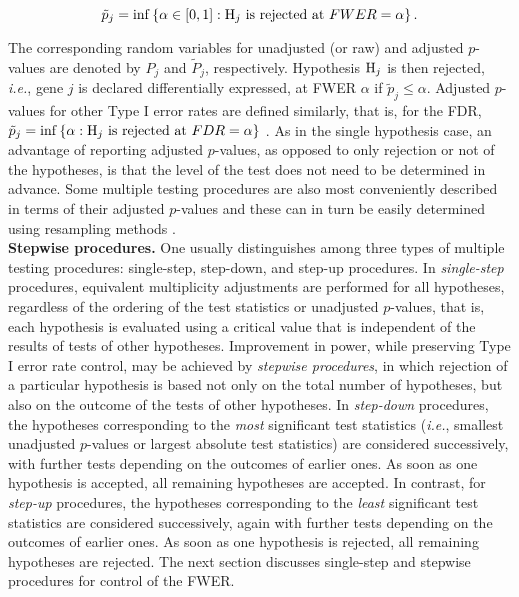 \documentclass[11pt]{article}
\begin{document}
$$\tilde{p}_j = \inf\left \{\alpha \in [0,1]: \mbox{${\rm H}_j$ is rejected at $FWER = \alpha$} \right \}.$$

The corresponding random variables for unadjusted (or raw) and adjusted
$p$-values are denoted by $P_j$ and $\tilde{P}_j$, respectively. Hypothesis ${\rm H}_j$ is then rejected, {\it i.e.}, gene $j$ is
declared differentially expressed, at FWER $\alpha$ if $\tilde{p}_j
\leq \alpha$. Adjusted $p$-values for other Type I error rates are
defined similarly, that is, for the FDR,  $\tilde{p}_j = \inf\left
  \{\alpha : \mbox{${\rm H}_j$ is rejected at $FDR = \alpha$} \right
\}$ \citep{Yekutieli&Benjamini99}. As in the single hypothesis case, an
advantage of reporting adjusted $p$-values, as opposed to only
rejection or not of the hypotheses, is that the level of the test does
not need to be determined in advance. Some multiple testing procedures
are also most conveniently described in terms of their adjusted
$p$-values and these can in turn be easily determined using resampling
methods \citep{Westfall&Young93}.\\

{\bf Stepwise procedures.} One usually distinguishes among three
types of multiple testing procedures: single-step, step-down, and
step-up procedures. In {\it single-step} procedures, equivalent
multiplicity adjustments are performed for all hypotheses, regardless
of the ordering of the test statistics or unadjusted
$p$-values, that is, each hypothesis is evaluated using a critical value that is independent of the results of tests of other hypotheses. Improvement in power, while preserving Type I error rate
control, may be achieved by {\it stepwise procedures}, in which
rejection of a particular hypothesis is based not only on the total
number of hypotheses, but also on the outcome of the tests of other
hypotheses. In {\it step-down} procedures, the hypotheses corresponding to the {\it most} significant test statistics ({\it i.e.}, smallest unadjusted $p$-values or largest absolute test statistics) are considered successively, with further tests depending on the outcomes of earlier ones. As soon as one hypothesis is accepted, all remaining hypotheses are accepted. In contrast, for {\it step-up} procedures, the hypotheses corresponding to the {\it least} significant test statistics are considered successively, again with further tests depending on the outcomes of earlier ones. As soon as one hypothesis is rejected, all remaining hypotheses are rejected.  The next section discusses single-step and stepwise procedures for control of the FWER.
\end{document}
